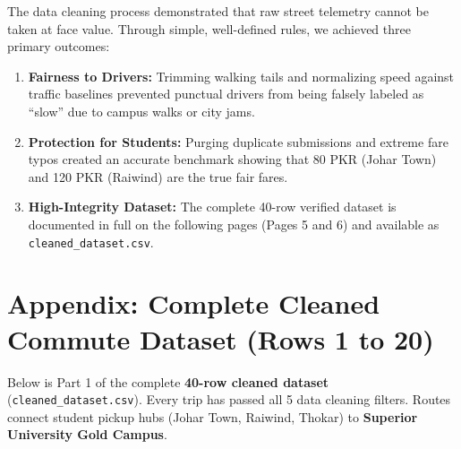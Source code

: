 \documentclass[10pt, a4paper]{article}
\begin{document}
The data cleaning process demonstrated that raw street telemetry cannot be taken at face value. Through simple, well-defined rules, we achieved three primary outcomes:
\begin{enumerate}\setlength{\itemsep}{1.2pt}\setlength{\parskip}{0pt}
  \item \textbf{Fairness to Drivers:} Trimming walking tails and normalizing speed against traffic baselines prevented punctual drivers from being falsely labeled as ``slow'' due to campus walks or city jams.
  \item \textbf{Protection for Students:} Purging duplicate submissions and extreme fare typos created an accurate benchmark showing that 80 PKR (Johar Town) and 120 PKR (Raiwind) are the true fair fares.
  \item \textbf{High-Integrity Dataset:} The complete 40-row verified dataset is documented in full on the following pages (Pages 5 and 6) and available as \texttt{cleaned\_dataset.csv}.
\end{enumerate}

\newpage


\section{Appendix: Complete Cleaned Commute Dataset (Rows 1 to 20)}

Below is Part 1 of the complete \textbf{40-row cleaned dataset} (\texttt{cleaned\_dataset.csv}). Every trip has passed all 5 data cleaning filters. Routes connect student pickup hubs (Johar Town, Raiwind, Thokar) to \textbf{Superior University Gold Campus}.

\vspace{2pt}
\end{document}
